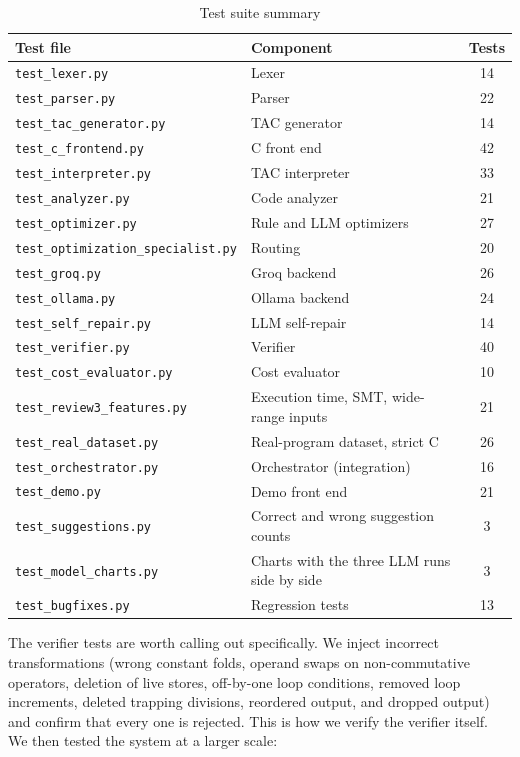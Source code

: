 \documentclass[12pt,a4paper]{report}
\begin{document}
\begin{table}[H]
\centering
\caption{Test suite summary}
\label{tab:tests}
\small
\begin{tabular}{|l|l|c|}
\hline
\textbf{Test file} & \textbf{Component} & \textbf{Tests} \\
\hline
\texttt{test\_lexer.py} & Lexer & 14 \\
\hline
\texttt{test\_parser.py} & Parser & 22 \\
\hline
\texttt{test\_tac\_generator.py} & TAC generator & 14 \\
\hline
\texttt{test\_c\_frontend.py} & C front end & 42 \\
\hline
\texttt{test\_interpreter.py} & TAC interpreter & 33 \\
\hline
\texttt{test\_analyzer.py} & Code analyzer & 21 \\
\hline
\texttt{test\_optimizer.py} & Rule and LLM optimizers & 27 \\
\hline
\texttt{test\_optimization\_specialist.py} & Routing & 20 \\
\hline
\texttt{test\_groq.py} & Groq backend & 26 \\
\hline
\texttt{test\_ollama.py} & Ollama backend & 24 \\
\hline
\texttt{test\_self\_repair.py} & LLM self-repair & 14 \\
\hline
\texttt{test\_verifier.py} & Verifier & 40 \\
\hline
\texttt{test\_cost\_evaluator.py} & Cost evaluator & 10 \\
\hline
\texttt{test\_review3\_features.py} & Execution time, SMT, wide-range inputs & 21 \\
\hline
\texttt{test\_real\_dataset.py} & Real-program dataset, strict C & 26 \\
\hline
\texttt{test\_orchestrator.py} & Orchestrator (integration) & 16 \\
\hline
\texttt{test\_demo.py} & Demo front end & 21 \\
\hline
\texttt{test\_suggestions.py} & Correct and wrong suggestion counts & 3 \\
\hline
\texttt{test\_model\_charts.py} & Charts with the three LLM runs side by side & 3 \\
\hline
\texttt{test\_bugfixes.py} & Regression tests & 13 \\
\hline
\end{tabular}
\end{table}

The verifier tests are worth calling out specifically. We inject incorrect transformations (wrong constant folds, operand swaps on non-commutative operators, deletion of live stores, off-by-one loop conditions, removed loop increments, deleted trapping divisions, reordered output, and dropped output) and confirm that every one is rejected. This is how we verify the verifier itself. We then tested the system at a larger scale:
\end{document}
